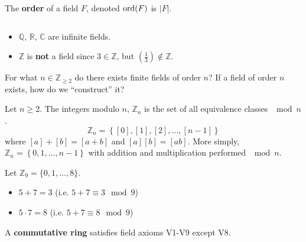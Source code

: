 \begin{defbox}
    \begin{definition}
        The \textbf{order} of a field $ F $, denoted $ \operatorname{ord}(F) $ is $ |F| $.
    \end{definition}
\end{defbox}

\begin{exbox}
    \begin{example}
        $ \; $
        \begin{itemize}
            \item $ \mathbb{Q},\,\mathbb{R},\,\mathbb{C} $ are infinite fields.
            \item $ \mathbb{Z} $ is \textbf{not} a field since $ 3\in\mathbb{Z} $, but
                  $ \left(\frac{1}{3}\right)\notin\mathbb{Z} $.
        \end{itemize}
    \end{example}
\end{exbox}

 For what $ n\in\mathbb{Z}_{\geqslant 2} $ do there exists
finite fields of order $ n $? If a field of order $ n $ exists, how do
we ``construct'' it?

 Let $ n\geqslant 2 $. The integers modulo $ n $,
$ \mathbb{Z}_n $ is the set of all equivalence classes $ \mod n $.
\[ \mathbb{Z}_n=\left\{ [0],[1],[2],\ldots ,[n-1]\right\} \]
where $ [a]+[b]=[a+b] $ and $ [a][b]=[ab] $.
More simply, $ \mathbb{Z}_{n}=\left\{ 0,1,\ldots ,n-1\right\} $
with addition and multiplication performed $ \mod n $.

\begin{exbox}
    \begin{example}[Modulo]
        Let $ \mathbb{Z}_9=\{0,1,\ldots ,8\} $.
        \begin{itemize}
            \item $ 5+7=3 $ (i.e. $ 5+7\equiv 3 \mod 9 $)
            \item $ 5\cdot 7=8 $ (i.e. $ 5+7\equiv 8 \mod 9 $)
        \end{itemize}
    \end{example}
\end{exbox}

\begin{defbox}
    \begin{definition}
        A \textbf{commutative ring} satisfies field axioms V1-V9 except
        V8.
    \end{definition}
\end{defbox}

